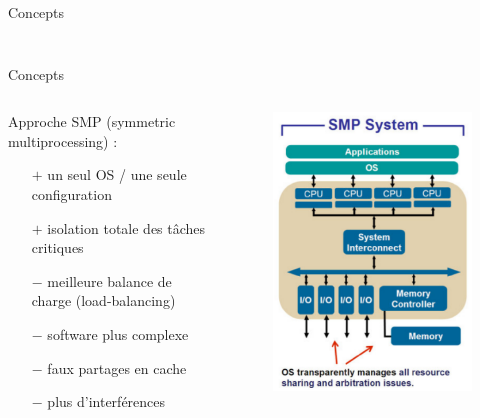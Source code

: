 \documentclass{beamer}
\begin{document}
\begin{frame}{Concepts}
\begin{columns}
\begin{column}{0.45\paperwidth}
\begin{figure}
			\end{figure}	
		\end{column}
	\end{columns}
\end{frame}

\begin{frame}{Concepts}
	\begin{columns}
		\begingroup
		\small
		\hspace{0.3cm}
		\begin{column}{0.55\paperwidth}
			Approche SMP (symmetric multi\-processing) :
				\begin{itemize}
					\item[$+$] un seul OS / une seule configuration
					\item[$+$] isolation totale des tâches critiques
					\item[$-$] meilleure balance de charge (load-balancing)
					\item[$-$] software plus complexe
					\item[$-$] faux partages en cache
					\item[$-$] plus d'interférences
				\end{itemize}
		\end{column}
		\endgroup
		\begin{column}{0.45\paperwidth}
			\begin{figure}
				\centering
				\includegraphics[width=0.7\linewidth]{smp.png}
			\end{figure}	
		\end{column}
	\end{columns}
\end{frame}
\end{document}
